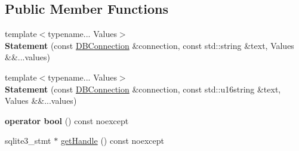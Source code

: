 \subsection*{Public Member Functions}
\begin{DoxyCompactItemize}
\item 
\hypertarget{class_s_q_lite_1_1_statement_ac4f1af971f094f30c445bcc18ffc4e27}{{\footnotesize template$<$typename... Values$>$ }\\{\bfseries Statement} (const \hyperlink{class_s_q_lite_1_1_d_b_connection}{D\-B\-Connection} \&connection, const std\-::string \&text, Values \&\&...values)}\label{class_s_q_lite_1_1_statement_ac4f1af971f094f30c445bcc18ffc4e27}

\item 
\hypertarget{class_s_q_lite_1_1_statement_a3857ee340dd2769fafe10259cf4858a3}{{\footnotesize template$<$typename... Values$>$ }\\{\bfseries Statement} (const \hyperlink{class_s_q_lite_1_1_d_b_connection}{D\-B\-Connection} \&connection, const std\-::u16string \&text, Values \&\&...values)}\label{class_s_q_lite_1_1_statement_a3857ee340dd2769fafe10259cf4858a3}

\item 
\hypertarget{class_s_q_lite_1_1_statement_a3b7793f1490a321159690cf096ec74d6}{{\bfseries operator bool} () const noexcept}\label{class_s_q_lite_1_1_statement_a3b7793f1490a321159690cf096ec74d6}

\item 
\hypertarget{class_s_q_lite_1_1_statement_a9052c143879aca6cf253925336464a8b}{sqlite3\-\_\-stmt $\ast$ \hyperlink{class_s_q_lite_1_1_statement_a9052c143879aca6cf253925336464a8b}{get\-Handle} () const noexcept}\label{class_s_q_lite_1_1_statement_a9052c143879aca6cf253925336464a8b}


\end{DoxyCompactItemize}
